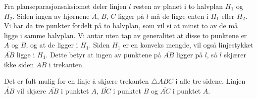 \begin{oppgave}[3.3.5]
  Fra planseparasjonsaksiomet deler linjen $l$ resten av planet i to halvplan $H_1$ og $H_2$. 
  Siden ingen av hjørnene $A$, $B$, $C$ ligger på $l$ må de ligge enten i $H_1$ eller 
  $H_2$. Vi har da tre punkter fordelt på to halvplan, som vil si at minst to av de må ligge i samme
  halvplan. Vi antar uten tap av generalitet at disse to punktene er $A$ og $B$, og at de ligger i 
  $H_1$. Siden $H_1$ er en konveks mengde, vil også linjestykket $\overline{AB}$ ligge i $H_1$. Dette
  betyr at ingen av punktene på $\overline{AB}$ ligger på $l$, så $l$ skjærer ikke siden $\overline{AB}$
  i trekanten. 

  Det er fult mulig for en linje å skjære trekanten $\triangle ABC$ i alle tre sidene. Linjen 
  $\overleftrightarrow{AB}$ vil skjære $\overline{AB}$ i punktet $A$, $\overline{BC}$ i punktet $B$ og 
  $\overline{AC}$ i punktet $A$. 

\end{oppgave}
 

